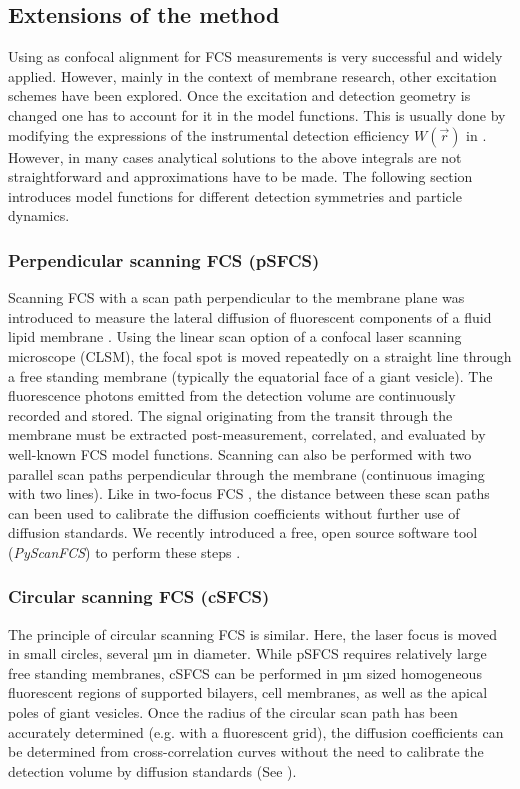 \subsection{Extensions of the method}
\label{sec:theor.exten}
Using as confocal alignment for FCS measurements is very successful and widely applied. However, mainly in the context of membrane research, other excitation schemes have been explored. Once the excitation and detection geometry is changed one has to account for it in the model functions. This is usually done by modifying the expressions of the instrumental detection efficiency $W(\vec{r})$ in . However, in many cases analytical solutions to the above integrals are not straightforward and approximations have to be made. The following section introduces model functions for different detection symmetries and particle dynamics.

\subsubsection{Perpendicular scanning FCS (pSFCS)}
\label{sec:theor.exten.perpe}
Scanning FCS with a scan path perpendicular to the membrane plane was introduced to measure the lateral diffusion of fluorescent components of a fluid lipid membrane \cite{Ries2006}. Using the linear scan option of a confocal laser scanning microscope (CLSM), the focal spot is moved repeatedly on a straight line through a free standing membrane (typically the equatorial face of a giant vesicle). The fluorescence photons emitted from the detection volume are continuously recorded and stored. The signal originating from the transit through the membrane must be extracted post-measurement, correlated, and evaluated by well-known FCS model functions. Scanning can also be performed with two parallel scan paths perpendicular through the membrane (continuous imaging with two lines). Like in two-focus FCS \cite{Dertinger2007}, the distance between these scan paths can been used to calibrate the diffusion coefficients without further use of diffusion standards. We recently introduced a free, open source software tool (\textit{PyScanFCS}) to perform these steps \cite{Muller2014}.

\subsubsection{Circular scanning FCS (cSFCS)}
\label{sec:theor.exten.circu}
The principle of circular scanning FCS is similar. Here, the laser focus is moved in small circles, several µm in diameter. While pSFCS requires relatively large free standing membranes, cSFCS can be performed in µm sized homogeneous fluorescent regions of supported bilayers, cell membranes, as well as the apical poles of giant vesicles. Once the radius of the circular scan path has been accurately determined (e.g. with a fluorescent grid), the diffusion coefficients can be determined from cross-correlation curves without the need to calibrate the detection volume by diffusion standards \cite{Petrasek2010,Petrasek2008} (See ).

